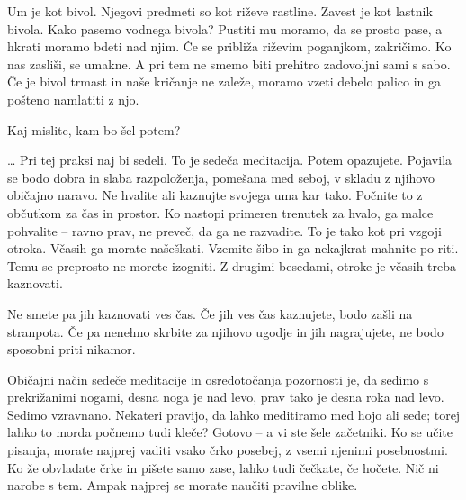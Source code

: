 \clearpage

\enlargethispage{2\baselineskip}


Um je kot bivol. Njegovi predmeti so kot riževe rastline. Zavest je kot lastnik bivola. Kako pasemo vodnega bivola? Pustiti mu moramo, da se prosto pase, a hkrati moramo bdeti nad njim. Če se približa riževim poganjkom, zakričimo. Ko nas zasliši, se umakne. A pri tem ne smemo biti prehitro zadovoljni sami s sabo. Če je bivol trmast in naše kričanje ne zaleže, moramo vzeti debelo palico in ga pošteno namlatiti z njo.

Kaj mislite, kam bo šel potem?

\vspace{-\baselineskip}

\ldots{} Pri tej praksi naj bi sedeli. To je sedeča meditacija. Potem opazujete. Pojavila se bodo dobra in slaba razpoloženja, pomešana med seboj, v skladu z njihovo običajno naravo. Ne hvalite ali kaznujte svojega uma kar tako. Počnite to z občutkom za čas in prostor. Ko nastopi primeren trenutek za hvalo, ga malce pohvalite – ravno prav, ne preveč, da ga ne razvadite. To je tako kot pri vzgoji otroka. Včasih ga morate našeškati. Vzemite šibo in ga nekajkrat mahnite po riti. Temu se preprosto ne morete izogniti. Z drugimi besedami, otroke je včasih treba kaznovati.

Ne smete pa jih kaznovati ves čas. Če jih ves čas kaznujete, bodo zašli na stranpota. Če pa nenehno skrbite za njihovo ugodje in jih nagrajujete, ne bodo sposobni priti nikamor.

\clearpage

\enlargethispage{2\baselineskip}


Običajni način sedeče meditacije in osredotočanja pozornosti je, da sedimo s prekrižanimi nogami, desna noga je nad levo, prav tako je desna roka nad levo. Sedimo vzravnano. Nekateri pravijo, da lahko meditiramo med hojo ali sede; torej lahko to morda počnemo tudi kleče? Gotovo – a vi ste šele začetniki. Ko se učite pisanja, morate najprej vaditi vsako črko posebej, z vsemi njenimi posebnostmi. Ko že obvladate črke in pišete samo zase, lahko tudi čečkate, če hočete. Nič ni narobe s tem. Ampak najprej se morate naučiti pravilne oblike.

\vspace{-2\baselineskip}

